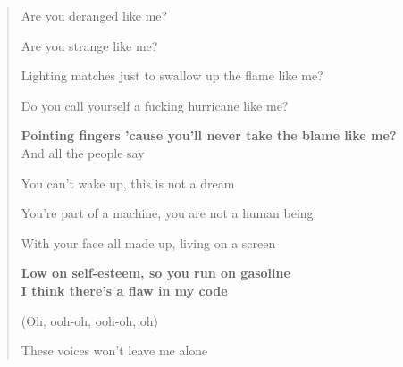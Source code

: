 \documentclass{article}
\begin{document}
\begin{enumerate}
\begin{quotation}
		Are you deranged like me?
		
		Are you strange like me?
		
		Lighting matches just to swallow up the flame like me?
		
		Do you call yourself a fucking hurricane like me?
		
		\textbf{Pointing fingers 'cause you'll never take the blame like me?}
		\\
		
		And all the people say
		
		You can't wake up, this is not a dream
		
		You're part of a machine, you are not a human being
		
		With your face all made up, living on a screen
		
		\textbf{Low on self-esteem, so you run on gasoline}
		\\
		
		\textbf{I think there's a flaw in my code}
		
		(Oh, ooh-oh, ooh-oh, oh)
		
		These voices won't leave me alone
		

\end{quotation}
\end{enumerate}
\end{document}
